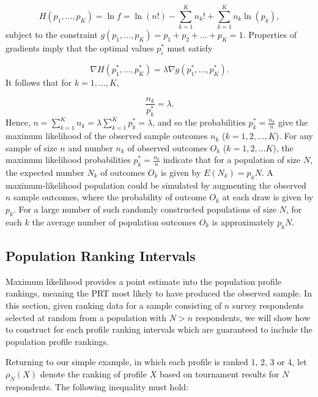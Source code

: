 \documentclass[a4paper, 12pt]{article}
\begin{document}
\begin{equation}
H(p_1, ..., p_K)=\ln f = \ln(n!) - \sum_{k=1}^{K} n_k! +\sum_{k=1}^{K} n_k\ln(p_k),
\end{equation}
\label{eq:5}
{\flushleft subject} to the constraint $g(p_1, ..., p_{K})=p_1+p_2+...+p_K=1$.  Properties of gradients imply that the optimal values $p_i^*$ must satisfy

\begin{equation}
\nabla H(p_1^*, ..., p_K^*) = \lambda \nabla g(p_1^*, ..., p_{K}^*).
\end{equation}
\label{eq:6}
{\flushleft It} follows that for $k=1, ..., K$,

\begin{equation}
\frac{n_k}{p_k^*}=\lambda.
\end{equation}
\label{eq:7}
{\flushleft Hence,} $n=\sum_{k=1}^{K} n_k =  \lambda \sum_{k=1}^{K} p_k^* = \lambda$, and so the probabilities $p_k^* = \frac{n_k}{n}$ give the maximum likelihood of the observed sample outcomes $n_k$ ($k=1, 2, ..., K$).  For any sample of size $n$ and number $n_k$ of observed outcomes $O_k$ ($k=1, 2, ...K$), the maximum likelihood probabilities $p_k^*=\frac{n_k}{n}$
indicate that for a population of size $N$, the expected number $N_k$ of outcomes $O_k$ is given by $E(N_k)=p_k N.$  A maximum-likelihood population could be simulated by augmenting the observed $n$ sample outcomes, where the probability of outcome $O_k$ at each draw is given by $p_k$.   For a large number of such randomly constructed populations of size $N$, for each $k$ the average number of population outcomes $O_k$ is approximately $p_k N$.






\subsection{Population Ranking Intervals}

Maximum likelihood  provides a point estimate into the population profile rankings, meaning the PRT most likely to have produced the observed sample. In this section, given ranking data for a sample consisting of $n$ survey respondents selected at random from a population with $N> n$ respondents, we will show how to construct for each profile ranking intervals   which are guaranteed to include the population profile rankings.

Returning to our simple example, in which each profile is ranked 1, 2, 3 or 4, let $\rho_N(X)$ denote the ranking of profile $X$ based on tournament results for $N$ respondents. The following inequality must hold:
\end{document}
